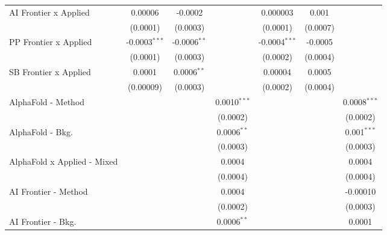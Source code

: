 \begin{tabular}{lcccccc}
   AI Frontier x Applied          & 0.00006         & -0.0002         &                 & 0.000003        & 0.001          &   \\   
                                  & (0.0001)        & (0.0003)        &                 & (0.0001)        & (0.0007)       &   \\   
   PP Frontier x Applied          & -0.0003$^{***}$ & -0.0006$^{**}$  &                 & -0.0004$^{***}$ & -0.0005        &   \\   
                                  & (0.0001)        & (0.0003)        &                 & (0.0002)        & (0.0004)       &   \\   
   SB Frontier x Applied          & 0.0001          & 0.0006$^{**}$   &                 & 0.00004         & 0.0005         &   \\   
                                  & (0.00009)       & (0.0003)        &                 & (0.0002)        & (0.0004)       &   \\   
   AlphaFold - Method             &                 &                 & 0.0010$^{***}$  &                 &                & 0.0008$^{***}$\\   
                                  &                 &                 & (0.0002)        &                 &                & (0.0002)\\   
   AlphaFold - Bkg.               &                 &                 & 0.0006$^{**}$   &                 &                & 0.001$^{***}$\\   
                                  &                 &                 & (0.0003)        &                 &                & (0.0003)\\   
   AlphaFold x Applied - Mixed    &                 &                 & 0.0004          &                 &                & 0.0004\\   
                                  &                 &                 & (0.0004)        &                 &                & (0.0004)\\   
   AI Frontier - Method           &                 &                 & 0.0004          &                 &                & -0.00010\\   
                                  &                 &                 & (0.0002)        &                 &                & (0.0003)\\   
   AI Frontier - Bkg.             &                 &                 & 0.0006$^{**}$   &                 &                & 0.0001\\   

\end{tabular}
